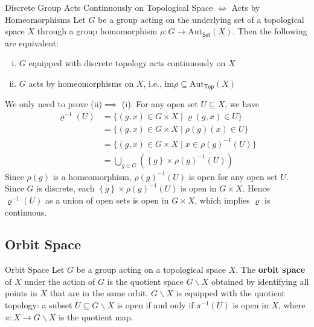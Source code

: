 \documentclass{report}
\begin{document}
\begin{proposition}{Discrete Group Acts Continuously on Topological Space $\iff$ Acts by Homeomorphisms}{}
	Let $G$ be a group acting on the underlying set of a topological space $X$ through a group homomorphism $\rho:G\to \mathrm{Aut}_{\mathsf{Set}}(X)$. Then the following are equivalent:
	\begin{enumerate}[(i)]
		\item $G$ equipped with discrete topology acts continuously on $X$
		\item $G$ acts by homeomorphisms on $X$, i.e.,
		      $\mathrm{im}\rho \subseteq \mathrm{Aut}_{\mathsf{Top}}(X)$
	\end{enumerate}
\end{proposition}
\begin{prf}
	We only need to prove (ii)$\implies$ (i). For any open set $U\subseteq X$, we have
	\begin{align*}
		\varrho^{-1}(U) & =\{(g,x)\in G\times X\mid \varrho(g,x)\in U\}                         \\
		                & =\{(g,x)\in G\times X\mid \rho(g)(x)\in U\}                           \\
		                & =\{(g,x)\in G\times X\mid x\in \rho(g)^{-1}(U)\}                      \\
		                & =\bigcup_{g\in G}\left(\left\{g\right\}\times \rho(g)^{-1}(U) \right)
	\end{align*}
	Since $\rho(g)$ is a homeomorphism, $\rho(g)^{-1}(U)$ is open for any open set $U$. Since $G$ is discrete,  each $\left\{g\right\}\times \rho(g)^{-1}(U)$ is open in $G\times X$. Hence $\varrho^{-1}(U)$ as a union of open sets is open in $G\times X$, which implies $\varrho$ is continuous.
\end{prf}

\subsection{Orbit Space}

\begin{definition}{Orbit Space}{}
	Let $G$ be a group acting on a topological space $X$. The \textbf{orbit space} of $X$ under the action of $G$ is the quotient space $G\backslash X $ obtained by identifying all points in $X$ that are in the same orbit. $G\backslash X $ is equipped with the quotient topology: a subset $U\subseteq G\backslash X $ is open if and only if $\pi^{-1}(U)$ is open in $X$, where $\pi:X\to  G\backslash X$ is the quotient map.
\end{definition}
\end{document}
